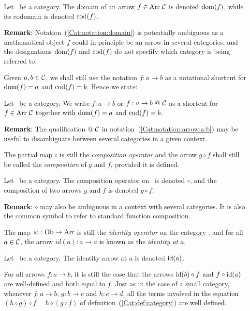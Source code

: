\begin{notation}\label{Cat:notation:domain}
    Let \Cat\ be a category. The domain of an arrow $f\in\mbox{\rm Arr}\ \mbox{$\cal C$}$ is 
    denoted $\mbox{\rm dom}(f)$, while its codomain is denoted $\mbox{\rm cod}(f)$.
\end{notation}


\noindent
{\bf Remark}: Notation~(\ref{Cat:notation:domain}) is potentially ambiguous 
as a mathematical object $f$ could in principle be an arrow in several 
categories, and the designations $\mbox{\rm dom}(f)$ and $\mbox{\rm cod}(f)$ do not specfify 
which category is being referred to.

Given $a,b\in\mbox{$\cal C$}$, we shall still use the notation $f:a\to b$ as a
notational shortcut for $\mbox{\rm dom}(f)=a$ and $\mbox{\rm cod}(f)=b$. Hence we state:

\begin{notation}\label{Cat:notation:arrow:a:b}
    Let \Cat\ be a category. We write $f:a\to b$ or $f:a\to b\ @\ \mbox{$\cal C$}$ 
    as a shortcut for $f\in\mbox{\rm Arr}\ \mbox{$\cal C$}$ together with $\mbox{\rm dom}(f)=a$ and 
    $\mbox{\rm cod}(f)=b$.
\end{notation}
\noindent
{\bf Remark}: The qualification $@\ \mbox{$\cal C$}$ in 
notation~(\ref{Cat:notation:arrow:a:b}) may be useful to disambiguate
between several categories in a given context.

The partial map $\circ$ is still the {\em composition operator} and the 
arrow $g\circ f$ shall still be called the {\em composition} of $g$ and $f$, 
provided it is defined. 
\begin{notation}\label{Cat:notation:composition}
    Let \Cat\ be a category. The composition
    operator on \Cat\ is denoted $\circ$, and the composition of 
    two arrows $g$ and $f$ is denoted $g\circ f$.
\end{notation}

\noindent
{\bf Remark}: $\circ$ may also be ambiguous in a context with several 
categories. It is also the common symbol to refer to standard function
composition.

The map $\mbox{\rm id}:\mbox{\rm Ob}\to\mbox{\rm Arr}$ is still the {\em identity operator}
on the category \Cat, and for all $a\in\mbox{$\cal C$}$, the arrow $id(a):a\to a$ is 
known as the {\em identity at} $a$. 

\begin{notation}\label{Cat:notation:identity}
    Let \Cat\ be a category. The identity arrow at $a$ is denoted 
    $\mbox{\rm id}(a)$.
\end{notation}

For all arrows $f:a\to b$, it is still
the case that the arrows $\mbox{\rm id}(b)\circ f$ and $f\circ\mbox{\rm id}(a)$ are well-defined
and both equal to $f$. Just as in the case of a small category, whenever 
$f:a\to b$, $g:b\to c$ and $h:c\to d$, all the terms involved in the 
equation $(h\circ g)\circ f=h\circ(g\circ f)$ of
definition~(\ref{Cat:def:category}) are well defined.


